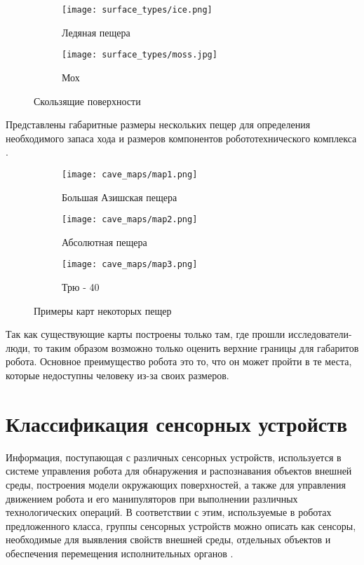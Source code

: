 \begin{figure}[H]
\begin{subfigure}{0.49\textwidth}
\centering\texttt{[image: surface\_types/ice.png]}\\
\caption{Ледяная пещера}
\label{fig:icee}
\end{subfigure}
\begin{subfigure}{0.49\textwidth}
\centering\texttt{[image: surface\_types/moss.jpg]}\\
\caption{Мох}
\label{fig:moss}
\end{subfigure}
\caption{Скользящие поверхности}
\label{fig:slippery_surfaces}
\end{figure}

Представлены габаритные размеры нескольких пещер для определения необходимого запаса хода и размеров компонентов робототехнического комплекса \cite{1960,1963,1969,1971}.

\begin{figure}[H]
\begin{subfigure}{0.8\textwidth}
\centering\texttt{[image: cave\_maps/map1.png]}\\
\caption{Большая Азишская пещера}
\label{fig:ice}
\end{subfigure}

\begin{subfigure}{0.8\textwidth}
\centering\texttt{[image: cave\_maps/map2.png]}\\
\caption{Абсолютная пещера}
\end{subfigure}

\begin{subfigure}{0.8\textwidth}
\centering\texttt{[image: cave\_maps/map3.png]}\\
\caption{Трю - 40}
\end{subfigure}
\caption{Примеры карт некоторых пещер}
\end{figure}

Так как существующие карты построены только там, где прошли исследователи-люди, то таким образом возможно только оценить верхние границы для габаритов робота. Основное преимущество робота это то, что он может пройти в те места, которые недоступны человеку из-за своих размеров.


\section{Классификация сенсорных устройств}
Информация, поступающая с различных сенсорных устройств, используется в системе управления робота для обнаружения и распознавания объектов внешней среды, построения модели окружающих поверхностей, а также для управления движением робота и его манипуляторов при выполнении различных технологических операций. В соответствии с этим, используемые в роботах предложенного класса, группы сенсорных устройств можно описать как сенсоры, необходимые для выявления свойств внешней среды, отдельных объектов и обеспечения перемещения исполнительных органов \cite{2013,1984,2015}.

